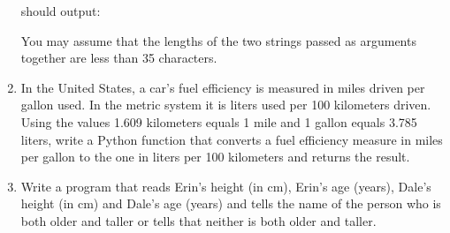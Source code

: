 \documentclass[letterpaper,10pt,english]{sphinxmanual}
\begin{document}
\begin{enumerate}
should output:

\begin{sphinxVerbatim}[commandchars=\\\{\}]
  
\end{sphinxVerbatim}

You may assume that the lengths of the two strings passed as arguments
together are less than 35 characters.

\item {} 
In the United States, a car’s fuel efficiency is measured in
miles driven per gallon used.  In the metric system it is liters
used per 100 kilometers driven.  Using the values 1.609 kilometers
equals 1 mile and 1 gallon equals 3.785 liters, write a Python
function that converts a fuel efficiency measure in miles per gallon
to the one in liters per 100 kilometers and returns the result.

\item {} 
Write a program that reads Erin’s height (in cm), Erin’s age (years),
Dale’s height (in cm) and Dale’s age (years) and tells the name of
the person who is both older and taller or tells that neither is
both older and taller.

\end{enumerate}
\end{document}
